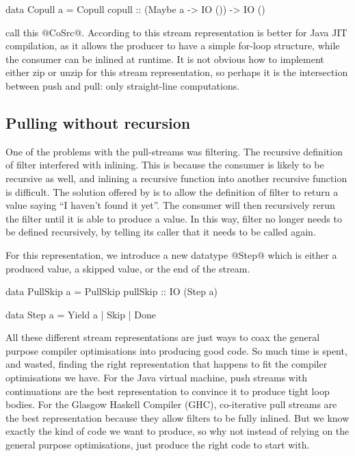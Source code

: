 \begin{code}
data Copull a
  = Copull
  { copull :: (Maybe a -> IO ()) -> IO () }
\end{code}

\citet{bernardy2015duality} call this @CoSrc@.
According to \citet{biboudis2017expressive} this stream representation is better for Java JIT compilation, as it allows the producer to have a simple for-loop structure, while the consumer can be inlined at runtime.
It is not obvious how to implement either zip or unzip for this stream representation, so perhaps it is the intersection between push and pull: only straight-line computations.

\subsection{Pulling without recursion}
One of the problems with the pull-streams was filtering.
The recursive definition of filter interfered with inlining.
This is because the consumer is likely to be recursive as well, and inlining a recursive function into another recursive function is difficult.
The solution offered by \citet{coutts2007stream} is to allow the definition of filter to return a value saying ``I haven't found it yet''.
The consumer will then recursively rerun the filter until it is able to produce a value.
In this way, filter no longer needs to be defined recursively, by telling its caller that it needs to be called again.

For this representation, we introduce a new datatype @Step@ which is either a produced value, a skipped value, or the end of the stream.

\begin{code}
data PullSkip a
  = PullSkip
  { pullSkip :: IO (Step a) }

data Step a
  = Yield a | Skip | Done
\end{code}

All these different stream representations are just ways to coax the general purpose compiler optimisations into producing good code.
So much time is spent, and wasted, finding the right representation that happens to fit the compiler optimisations we have.
For the Java virtual machine, push streams with continuations are the best representation to convince it to produce tight loop bodies.
For the Glasgow Haskell Compiler (GHC), co-iterative pull streams are the best representation because they allow filters to be fully inlined.
But we know exactly the kind of code we want to produce, so why not instead of relying on the general purpose optimisations, just produce the right code to start with.

